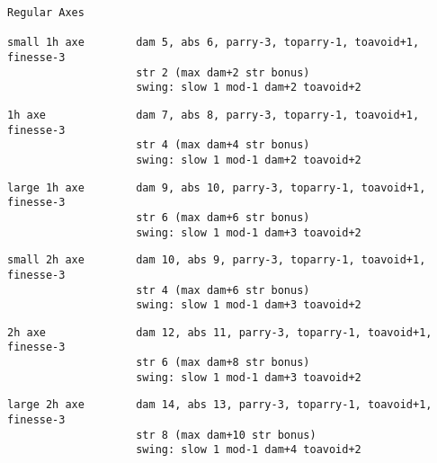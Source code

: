 \goodbreak \small \begin{samepage} \begin{verbatim}
Regular Axes

small 1h axe        dam 5, abs 6, parry-3, toparry-1, toavoid+1, finesse-3
                    str 2 (max dam+2 str bonus)
                    swing: slow 1 mod-1 dam+2 toavoid+2
\end{verbatim} \blocklistgap \begin{verbatim}
1h axe              dam 7, abs 8, parry-3, toparry-1, toavoid+1, finesse-3
                    str 4 (max dam+4 str bonus)
                    swing: slow 1 mod-1 dam+2 toavoid+2
\end{verbatim} \blocklistgap \begin{verbatim}
large 1h axe        dam 9, abs 10, parry-3, toparry-1, toavoid+1, finesse-3
                    str 6 (max dam+6 str bonus)
                    swing: slow 1 mod-1 dam+3 toavoid+2
\end{verbatim} \blocklistgap \begin{verbatim}
small 2h axe        dam 10, abs 9, parry-3, toparry-1, toavoid+1, finesse-3
                    str 4 (max dam+6 str bonus)
                    swing: slow 1 mod-1 dam+3 toavoid+2
\end{verbatim} \blocklistgap \begin{verbatim}
2h axe              dam 12, abs 11, parry-3, toparry-1, toavoid+1, finesse-3
                    str 6 (max dam+8 str bonus)
                    swing: slow 1 mod-1 dam+3 toavoid+2
\end{verbatim} \blocklistgap \begin{verbatim}
large 2h axe        dam 14, abs 13, parry-3, toparry-1, toavoid+1, finesse-3
                    str 8 (max dam+10 str bonus)
                    swing: slow 1 mod-1 dam+4 toavoid+2
\end{verbatim} \end{samepage} \normalsize \goodbreak

\

